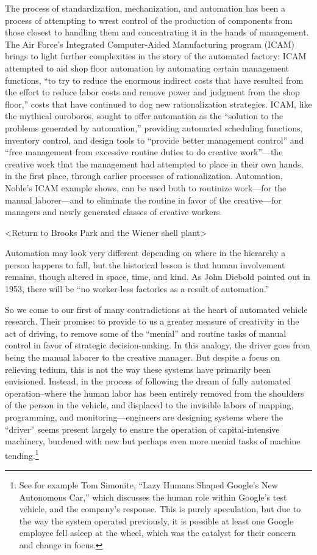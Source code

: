 The process of standardization,
mechanization, and automation has been a process of attempting to
wrest control of the production of components from those closest to
handling them and concentrating it in the hands of management. The Air Force's Integrated Computer-Aided Manufacturing program (ICAM)
brings to light further complexities in the story of the automated
factory: ICAM attempted to aid shop floor automation by automating certain
management functions, ``to try to reduce the enormous indirect costs
that have resulted from the effort to reduce labor costs and remove
power and judgment from the shop floor,'' costs that have continued to
dog new rationalization strategies.\cite[p. 330]{nobleForces} ICAM, like the mythical
ouroboros, sought to offer automation as the ``solution to the problems
generated by automation,'' providing automated scheduling functions,
inventory control, and design tools to ``provide better management
control'' and ``free management from excessive routine duties to do
creative work''---the creative work that the management had attempted to
place in their own hands, in the first place, through earlier
processes of rationalization.\cite[p. 330]{nobleForces}  Automation, Noble's ICAM example shows,
can be used both to routinize work---for the manual laborer---and to
eliminate the routine in favor of the creative---for managers and newly
generated classes of creative workers. 

<Return to Brooks Park and the Wiener shell plant>


Automation may look very different depending on where in the hierarchy
a person happens to fall, but the historical lesson is that human
involvement remains, though altered in space, time, and kind. As John
Diebold pointed out in 1953, there will be ``no worker-less
factories as a result of automation.''\cite[p. 63-64]{dieboldNew}

So we come to our first of many contradictions at the heart of
automated vehicle research. Their promise:
to provide to us a greater measure of creativity in the act of
driving, to remove some of the ``menial'' and routine tasks of manual
control in favor of strategic decision-making. In this analogy, the
driver goes from being the manual laborer to the creative manager. But
despite a focus on relieving tedium, this is not the way these systems
have primarily been envisioned. Instead, in the process of following
the dream of fully automated operation--where the human labor has been
entirely removed from the shoulders of the person in the vehicle, and
displaced to the invisible labors of mapping, programming, and
monitoring---engineers are designing systems where the ``driver''
seems present largely to ensure the operation of capital-intensive
machinery, burdened with new but perhaps even more menial tasks of
machine tending.\footnote{See for example Tom Simonite, ``Lazy Humans
Shaped Google's New Autonomous Car,''\cite{simonite}  which discusses
the human role within Google's test vehicle,
and the company's response. This is purely speculation, but due to
the way the system operated previously, it is possible at least one Google
employee fell asleep at the wheel, which was the catalyst for their
concern and change in focus.} 

